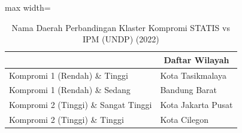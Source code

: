 \begin{table}[H]
\centering
\caption{Nama Daerah Perbandingan Klaster Kompromi STATIS vs IPM (UNDP) (2022)} \label{tab:sample2comp_ipm_name_2022}
\begin{adjustbox}{max width=\textwidth}
\begin{tabular}{|>{\centering\arraybackslash}p{4cm}|p{10cm}|}
\hline
\multicolumn{1}{|c|}{\textbf{Kategori}} & \multicolumn{1}{c|}{\textbf{Daftar Wilayah}} \\
\hline
Kompromi 1 (Rendah) \& Tinggi & Kota Tasikmalaya \\
\hline
Kompromi 1 (Rendah) \& Sedang & Bandung Barat \\
\hline
Kompromi 2 (Tinggi) \& Sangat Tinggi & Kota Jakarta Pusat \\
\hline
Kompromi 2 (Tinggi) \& Tinggi & Kota Cilegon \\
\hline
\end{tabular}
\end{adjustbox}
\end{table}